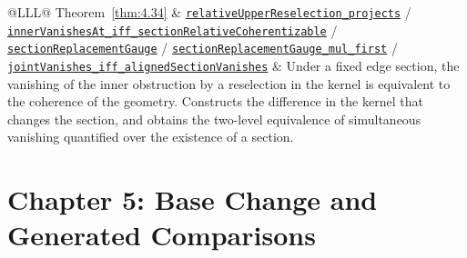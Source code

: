 \begin{xltabular}{\linewidth}{@{}LLL@{}}
Theorem~\ref{thm:4.34} & \href{https://github.com/iroha1203/AlgebraicArchitectureTheoryV2/blob/719f81f47d410701fd82c2bc88613cc140c59377/research/lean/ResearchLean/AG/CrossStageCoherence/RelativeObstruction.lean\#L48}{\texttt{relative\allowbreak{}Upper\allowbreak{}Reselection\_\allowbreak{}projects}} / \href{https://github.com/iroha1203/AlgebraicArchitectureTheoryV2/blob/719f81f47d410701fd82c2bc88613cc140c59377/research/lean/ResearchLean/AG/CrossStageCoherence/RelativeObstruction.lean\#L220}{\texttt{inner\allowbreak{}Vanishes\allowbreak{}At\_\allowbreak{}iff\_\allowbreak{}section\allowbreak{}Relative\allowbreak{}Coherentizable}} / \href{https://github.com/iroha1203/AlgebraicArchitectureTheoryV2/blob/719f81f47d410701fd82c2bc88613cc140c59377/research/lean/ResearchLean/AG/CrossStageCoherence/RelativeObstruction.lean\#L240}{\texttt{section\allowbreak{}Replacement\allowbreak{}Gauge}} / \href{https://github.com/iroha1203/AlgebraicArchitectureTheoryV2/blob/719f81f47d410701fd82c2bc88613cc140c59377/research/lean/ResearchLean/AG/CrossStageCoherence/RelativeObstruction.lean\#L255}{\texttt{section\allowbreak{}Replacement\allowbreak{}Gauge\_\allowbreak{}mul\_\allowbreak{}first}} / \href{https://github.com/iroha1203/AlgebraicArchitectureTheoryV2/blob/719f81f47d410701fd82c2bc88613cc140c59377/research/lean/ResearchLean/AG/CrossStageCoherence/GlobalVanishing.lean\#L266}{\texttt{joint\allowbreak{}Vanishes\_\allowbreak{}iff\_\allowbreak{}aligned\allowbreak{}Section\allowbreak{}Vanishes}} & Under a fixed edge section, the vanishing of the inner obstruction by a reselection in the kernel is equivalent to the coherence of the geometry. Constructs the difference in the kernel that changes the section, and obtains the two-level equivalence of simultaneous vanishing quantified over the existence of a section. \\
\bottomrule
\end{xltabular}

\section{Chapter 5: Base Change and Generated Comparisons}\label{sec:A.5}

